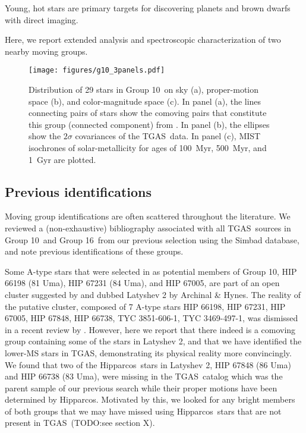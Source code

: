 \documentclass[modern,letterpaper]{aastex61}
\newcommand{\acronym}[1]{{\small{#1}}}
\newcommand{\hipparcos}{Hipparcos}
\newcommand{\tgas}{\acronym{TGAS}}
\newcommand{\groupTen}{Group 10}
\newcommand{\groupSixteen}{Group 16}
\newcommand{\todo}[1]{{\color{crimson}TODO:#1}}
\begin{document}
Young, hot stars are primary targets for discovering planets and brown dwarfs
with direct imaging.

Here, we report extended analysis and spectroscopic characterization of two
nearby moving groups.


\begin{figure}[ht]
  \centering
  \texttt{[image: figures/g10\_3panels.pdf]}
  \caption{\label{fig:g10_3panels}
    Distribution of 29 stars in \groupTen\ on sky (a),
    proper-motion space (b), and color-magnitude space (c).
    In panel (a), the lines connecting pairs of stars show the comoving pairs
    that constitute this group (connected component) from
    \citet{2017AJ....153..257O}.
    In panel (b), the ellipses show the $2\sigma$ covariances of the \tgas\
    data.
    In panel (c), MIST isochrones of solar-metallicity for ages of 100~Myr,
    500~Myr, and 1~Gyr are plotted.
  }
\end{figure}


\subsection{Previous identifications}
\label{subsec:history}

Moving group identifications are often scattered throughout the literature. We
reviewed a (non-exhaustive) bibliography associated with all \tgas\ sources in
\groupTen\ and \groupSixteen\ from our previous selection
\citep{2017AJ....153..257O} using the Simbad database, and note previous
identifications of these groups.

Some A-type stars that were selected in \citet{2017AJ....153..257O} as potential
members of \groupTen,
HIP 66198 (81 Uma), HIP 67231 (84 Uma), and HIP 67005, are part of an open cluster
suggested by \citet{1977ATsir.969....7L} and dubbed Latyshev 2 by Archinal \& Hynes.
The reality of the putative cluster, composed of 7 A-type stars
HIP 66198,
HIP 67231,
HIP 67005,
HIP 67848,
HIP 66738,
TYC 3851-606-1,
TYC 3469-497-1,
was dismissed in a recent review by \citet{2016IAUS..314...21M}.
However, here we report that there indeed is a comoving group containing
some of the stars in Latyshev 2, and that we have identified the lower-MS stars
in \tgas, demonstrating its physical reality more convincingly.
We found that two of the \hipparcos\ stars in Latyshev 2,
HIP 67848 (86 Uma) and HIP 66738 (83 Uma),
were missing in the \tgas\ catalog which was the parent sample of our previous search while
their proper motions have been determined by \hipparcos.
Motivated by this, we looked for any bright members of both groups that we
may have missed using \hipparcos\ stars that are not present in \tgas\ (\todo{see section X}).
\end{document}
